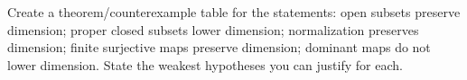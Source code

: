 \begin{problem}\label{chall:vi30-05}
Create a theorem/counterexample table for the statements: open subsets preserve dimension; proper closed subsets lower dimension; normalization preserves dimension; finite surjective maps preserve dimension; dominant maps do not lower dimension. State the weakest hypotheses you can justify for each.
\end{problem}
